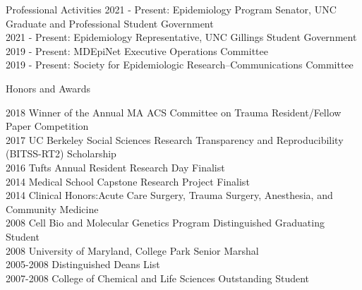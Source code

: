 \documentclass{resume} %
\begin{document}
\begin{rSection}{Professional Activities}
   2021 - Present: Epidemiology Program Senator,  UNC Graduate and Professional Student Government\\ 
   2021 - Present: Epidemiology Representative, UNC Gillings Student Government \\
   2019 - Present: MDEpiNet Executive Operations Committee\\
   2019 - Present: Society for Epidemiologic Research--Communications Committee
   
   \end{rSection}



\begin{rSection}{Honors and Awards}

   2018 \hspace{27.5pt} Winner of the Annual MA ACS Committee on Trauma Resident/Fellow Paper Competition\\
   2017 \hspace{27.5pt} UC Berkeley Social Sciences Research Transparency and Reproducibility (BITSS-RT2) Scholarship \\
   2016 \hspace{27.5pt} Tufts Annual Resident Research Day Finalist\\
   2014 \hspace{27.5pt} Medical School Capstone Research Project Finalist \\
   2014 \hspace{27.5pt} Clinical Honors:Acute Care Surgery, Trauma Surgery, Anesthesia, and Community Medicine \\
   2008 \hspace{27.5pt} Cell Bio and Molecular Genetics Program Distinguished Graduating Student\\
   2008 \hspace{27.5pt} University of Maryland, College Park Senior Marshal \\
   2005-2008 \enspace Distinguished Deans List \\
   2007-2008 \enspace  College of Chemical and Life Sciences Outstanding Student
   
   \end{rSection}
   
\end{document}
